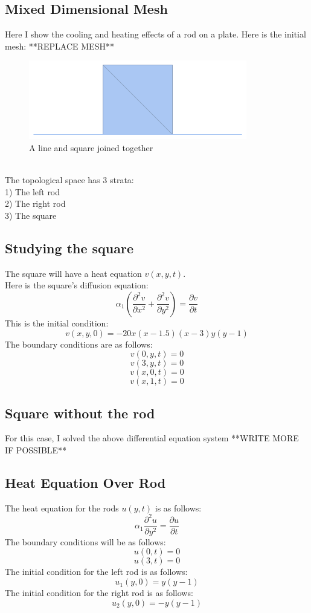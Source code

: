 \documentclass[twoside,11pt]{article}
\theoremstyle{definition}
\begin{document}
\subsection{Mixed Dimensional Mesh}

Here I show the cooling and heating effects of a rod on a plate. Here is the initial mesh:
**REPLACE MESH**
\begin{figure}[h]
\centering
\includegraphics[width=3 in]{mixedMeshPic.png}
\caption{A line and square joined together}
\end{figure}
\\
The topological space has 3 strata: \\
1) The left rod\\
2) The right rod\\
3) The square

\subsection{Studying the square}

The square will have a heat equation $v(x,y,t)$. \\
Here is the square's diffusion equation:
\[
\alpha_1 (\frac{\partial^2 v}{\partial x^2} + \frac{\partial^2 v}{\partial y^2}) = \frac{\partial v}{\partial t}
\]
This is the initial condition:
\[
v(x,y,0) = -20x(x-1.5)(x-3)y(y-1)
\]
The boundary conditions are as follows:
\[
v(0,y,t)=0
\]
\[
v(3,y,t)=0
\]
\[
v(x,0,t)=0
\]
\[
v(x,1,t)=0
\]

\subsection{Square without the rod}

For this case, I solved the above differential equation system **WRITE MORE IF POSSIBLE**
\newpage
\subsection{Heat Equation Over Rod}

The heat equation for the rods $u(y,t)$ is as follows:
\[
\alpha_1 \frac{\partial^2 u}{\partial y^2} = \frac{\partial u}{\partial t}
\]
The boundary conditions will be as follows:
\[
u(0,t)=0
\]
\[
u(3,t)=0
\]
The initial condition for the left rod is as follows:
\[
u_1(y,0)=y(y-1)
\]
The initial condition for the right rod is as follows:
\[
u_2(y,0)=-y(y-1)
\]
\end{document}
